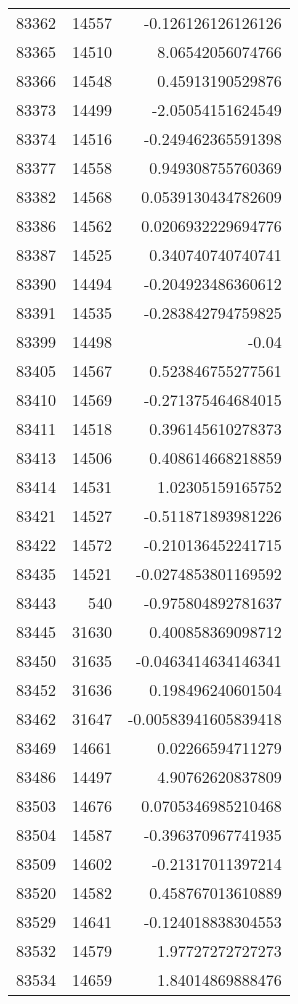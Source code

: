\begin{tabular}{r | r | r}
83362 & 14557 & -0.126126126126126 \\
83365 & 14510 & 8.06542056074766 \\
83366 & 14548 & 0.45913190529876 \\
83373 & 14499 & -2.05054151624549 \\
83374 & 14516 & -0.249462365591398 \\
83377 & 14558 & 0.949308755760369 \\
83382 & 14568 & 0.0539130434782609 \\
83386 & 14562 & 0.0206932229694776 \\
83387 & 14525 & 0.340740740740741 \\
83390 & 14494 & -0.204923486360612 \\
83391 & 14535 & -0.283842794759825 \\
83399 & 14498 & -0.04 \\
83405 & 14567 & 0.523846755277561 \\
83410 & 14569 & -0.271375464684015 \\
83411 & 14518 & 0.396145610278373 \\
83413 & 14506 & 0.408614668218859 \\
83414 & 14531 & 1.02305159165752 \\
83421 & 14527 & -0.511871893981226 \\
83422 & 14572 & -0.210136452241715 \\
83435 & 14521 & -0.0274853801169592 \\
83443 & 540 & -0.975804892781637 \\
83445 & 31630 & 0.400858369098712 \\
83450 & 31635 & -0.0463414634146341 \\
83452 & 31636 & 0.198496240601504 \\
83462 & 31647 & -0.00583941605839418 \\
83469 & 14661 & 0.02266594711279 \\
83486 & 14497 & 4.90762620837809 \\
83503 & 14676 & 0.0705346985210468 \\
83504 & 14587 & -0.396370967741935 \\
83509 & 14602 & -0.21317011397214 \\
83520 & 14582 & 0.458767013610889 \\
83529 & 14641 & -0.124018838304553 \\
83532 & 14579 & 1.97727272727273 \\
83534 & 14659 & 1.84014869888476 \\

\end{tabular}
